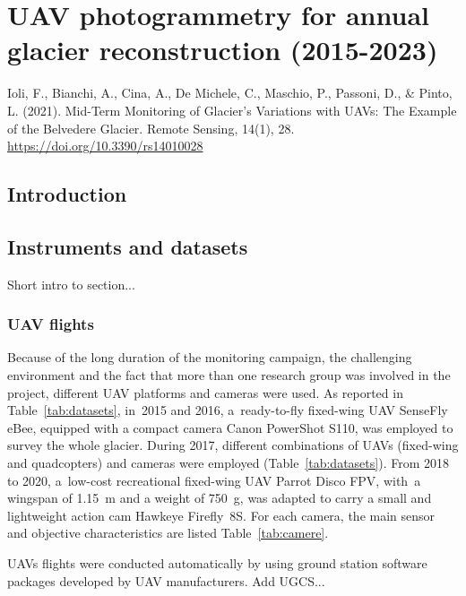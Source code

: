 \graphicspath{{figures/chapter3/}}

\chapter{UAV photogrammetry for annual glacier reconstruction (2015-2023)}\label{ch:3}

\vfill


\noindent Ioli, F., Bianchi, A., Cina, A., De Michele, C., Maschio, P., Passoni, D., \&
Pinto, L. (2021). Mid-Term Monitoring of Glacier’s Variations with UAVs: The Example of
the Belvedere Glacier. Remote Sensing, 14(1), 28.
\url{https://doi.org/10.3390/rs14010028}

\newpage

\section{Introduction}

\section{Instruments and datasets}

 {\color{red} Short intro to section...}

\subsection{UAV flights}

Because of the long duration of the monitoring campaign, the challenging environment and
the fact that more than one research group was involved in the project, different UAV
platforms and cameras were used.
As reported in Table~\ref{tab:datasets}, in~2015 and 2016, a~ready-to-fly fixed-wing UAV
SenseFly eBee, equipped with a compact camera Canon PowerShot S110, was employed to
survey the whole glacier.
During 2017, different combinations of UAVs (fixed-wing and quadcopters) and cameras were
employed (Table~\ref{tab:datasets}).
From 2018 to 2020, a~low-cost recreational fixed-wing UAV Parrot Disco FPV, with~a
wingspan of \SI{1.15}{\meter} and a weight of \SI{750}{\gram}, was adapted to carry a
small and lightweight action cam Hawkeye Firefly~8S.
For each camera, the main sensor and objective characteristics are listed
Table~\ref{tab:camere}.

UAVs flights were conducted automatically by using ground station software packages
developed by UAV manufacturers.
    {\color{red} Add UGCS...}

